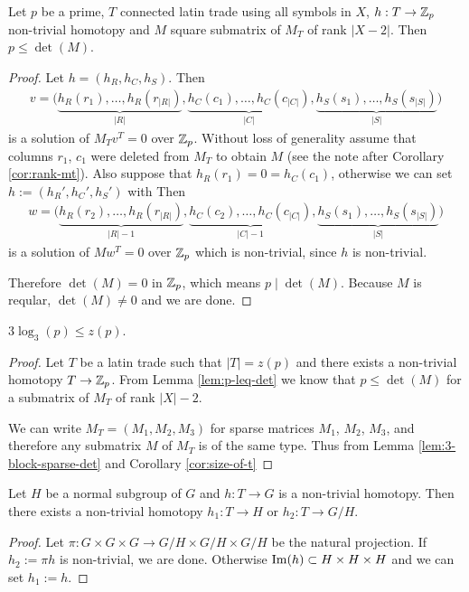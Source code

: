 \begin{lem}
\label{lem:p-leq-det}
Let $p$ be a prime, $T$ connected latin trade using all symbols in $X$, $h: T \rightarrow \mathbb Z_p$ non-trivial homotopy and $M$  square submatrix of $M_T$ of rank $|X-2|$. Then $p \leq \det(M)$.
\end{lem}
\begin{proof}
Let $h = (h_R,h_C,h_S)$. Then
\begin{align*}
	v = \big(\underbrace{h_R(r_1), \dots, h_R(r_{|R|})}_{|R|},\underbrace{h_C(c_1), \dots, h_C(c_{|C|})}_{|C|}, \underbrace{h_S(s_1), \dots, h_S(s_{|S|})}_{|S|}\big)
\end{align*}
is a solution of $M_Tv^T = 0$ over $\mathbb Z_p$. Without loss of generality assume that columns $r_1$, $c_1$ were deleted from $M_T$ to obtain $M$ (see the note after Corollary \ref{cor:rank-mt}). Also suppose that $h_R(r_1) = 0 = h_C(c_1)$, otherwise we can set $h := (h_R', h_C', h_S')$ with
%
Then
\begin{align*}
	w = \big(\underbrace{h_R(r_2), \dots, h_R(r_{|R|})}_{|R|-1},\underbrace{h_C(c_2), \dots, h_C(c_{|C|})}_{|C|-1}, \underbrace{h_S(s_1), \dots, h_S(s_{|S|})}_{|S|}\big)
\end{align*}
is a solution of $Mw^T = 0$ over $\mathbb Z_p$ which is non-trivial, since $h$ is non-trivial.

Therefore $\det(M) = 0$ in $\mathbb Z_p$, which means $p \mid \det(M)$. Because $M$ is reqular, $\det(M) \ne 0$ and we are done.
\end{proof}

\begin{lem}
\label{lem:lower-bound-zp}
$3 \log_3(p) \leq z(p)$.
\end{lem}%
\begin{proof}
Let $T$ be a latin trade such that $|T| = z(p)$ and there exists a non-trivial homotopy $T \rightarrow \mathbb Z_p$. From Lemma \ref{lem:p-leq-det} we know that $p \leq \det(M)$ for a submatrix of $M_T$ of rank $|X|-2$.

We can write $M_T = (M_1, M_2, M_3)$ for sparse matrices $M_1$, $M_2$, $M_3$, and therefore any submatrix $M$ of $M_T$ is of the same type. Thus from Lemma \ref{lem:3-block-sparse-det} and Corollary \ref{cor:size-of-t}
%
\end{proof}

\begin{lem}
\label{lem:nontrivial-homotopy-normal-subgroup}
Let $H$ be a normal subgroup of $G$ and $h: T \rightarrow G$ is a non-trivial homotopy. Then there exists a non-trivial homotopy $h_1: T \rightarrow H$ or $h_2: T \rightarrow G/H$.
\end{lem}
\begin{proof}
Let $\pi: G \times G \times G \rightarrow G/H \times G/H \times G/H$ be the natural projection. If $h_2 := \pi h$ is non-trivial, we are done. Otherwise $\mathop{\mathrm{Im}}(h) \subset H \times H \times H$ and we can set $h_1 := h$.
\end{proof}

